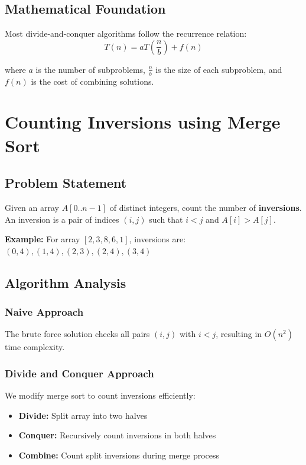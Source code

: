 \documentclass[12pt,a4paper]{article}
\begin{document}
\subsection{Mathematical Foundation}
Most divide-and-conquer algorithms follow the recurrence relation:
\[
T(n) = aT\left(\frac{n}{b}\right) + f(n)
\]

where $a$ is the number of subproblems, $\frac{n}{b}$ is the size of each subproblem, and $f(n)$ is the cost of combining solutions.

\newpage

\section{Counting Inversions using Merge Sort}

\subsection{Problem Statement}
\begin{tcolorbox}[colback=blue!5!white,colframe=blue!50!black,title=\textbf{Inversion Count Problem}]
Given an array $A[0..n-1]$ of distinct integers, count the number of \textbf{inversions}. An inversion is a pair of indices $(i, j)$ such that $i < j$ and $A[i] > A[j]$.

\textbf{Example:} For array $[2, 3, 8, 6, 1]$, inversions are: $(0,4), (1,4), (2,3), (2,4), (3,4)$
\end{tcolorbox}

\subsection{Algorithm Analysis}

\subsubsection{Naive Approach}
The brute force solution checks all pairs $(i,j)$ with $i < j$, resulting in $O(n^2)$ time complexity.

\subsubsection{Divide and Conquer Approach}
We modify merge sort to count inversions efficiently:

\begin{itemize}
    \item \textbf{Divide:} Split array into two halves
    \item \textbf{Conquer:} Recursively count inversions in both halves
    \item \textbf{Combine:} Count split inversions during merge process
\end{itemize}
\end{document}

